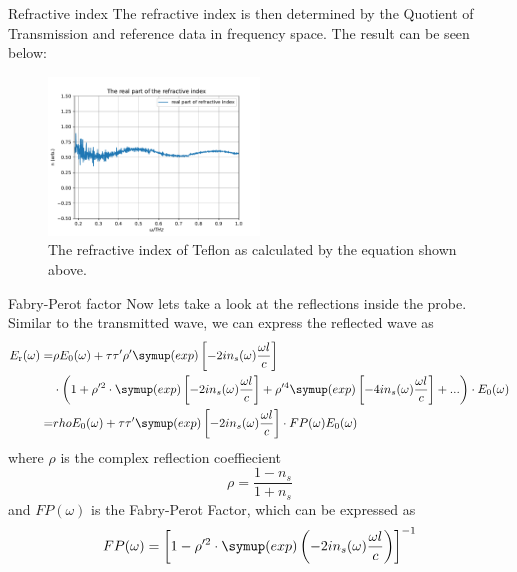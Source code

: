 \documentclass[aspectratio=1610, 9pt]{beamer}
\begin{document}
\begin{frame}{Refractive index}
  The refractive index is then determined by the Quotient of Transmission and reference data in frequency space.
  The result can be seen below:
  \begin{center}
    \begin{figure}
      \includegraphics[width=0.5\textwidth]{images/THz5_1.pdf}
      \caption{The refractive index of Teflon as calculated by the equation shown above.}
    \end{figure}
  \end{center}
\end{frame}

\begin{frame}{Fabry-Perot factor}
  Now lets take a look at the reflections inside the probe.
  Similar to the transmitted wave, we can express the reflected wave as 
  \begin{align*}
    E_\text{r}(\omega) =& \rho E_0(\omega) + \tau \tau' \rho' \symup(exp) \left[ -2 i n_s(\omega) \frac{\omega l }{c}\right]\\
                        & \cdot \left( 1 + \rho'^2 \cdot \symup(exp)\left[ -2 i n_s(\omega) \frac{\omega l }{c}\right] + \rho'^4 \symup(exp) \left[ -4 i n_s(\omega) \frac{\omega l }{c}\right] + ...\right) \cdot E_0 (\omega) \\
                       =& rho E_0(\omega) + \tau \tau' \symup(exp)\left[ -2 i n_s(\omega) \frac{\omega l }{c}\right] \cdot FP(\omega) E_0(\omega)
  \end{align*}
  where $\rho$ is the complex reflection coeffiecient 
  \begin{equation}
    \rho = \frac{1 - n_s}{1 + n_s}
  \end{equation}
  and $FP(\omega)$ is the Fabry-Perot Factor, which can be expressed as 
  \begin{equation}
    FP(\omega) = \left[1 - \rho'^2 \cdot \symup(exp)\left(- 2 i n_s(\omega )\frac{\omega l }{c}\right)\right]^{-1}
  \end{equation}
\end{frame}
\end{document}
